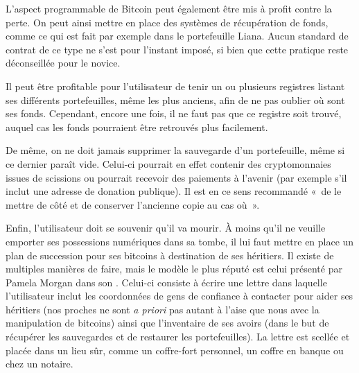 L'aspect programmable de Bitcoin peut également être mis à profit contre la perte. On peut ainsi mettre en place des systèmes de récupération de fonds, comme ce qui est fait par exemple dans le portefeuille Liana. Aucun standard de contrat de ce type ne s'est pour l'instant imposé, si bien que cette pratique reste déconseillée pour le novice. %

Il peut être profitable pour l'utilisateur de tenir un ou plusieurs registres listant ses différents portefeuilles, même les plus anciens, afin de ne pas oublier où sont ses fonds. Cependant, encore une fois, il ne faut pas que ce registre soit trouvé, auquel cas les fonds pourraient être retrouvés plus facilement.

De même, on ne doit jamais supprimer la sauvegarde d'un portefeuille, même si ce dernier paraît vide. Celui-ci pourrait en effet contenir des cryptomonnaies issues de scissions ou pourrait recevoir des paiements à l'avenir (par exemple s'il inclut une adresse de donation publique). Il est en ce sens recommandé «~de le mettre de côté et de conserver l'ancienne copie au cas où~».

Enfin, l'utilisateur doit se souvenir qu'il va mourir. À moins qu'il ne veuille emporter ses possessions numériques dans sa tombe, il lui faut mettre en place un plan de succession pour ses bitcoins à destination de ses héritiers. Il existe de multiples manières de faire, mais le modèle le plus réputé est celui présenté par Pamela Morgan dans son . Celui-ci consiste à écrire une lettre dans laquelle l'utilisateur inclut les coordonnées de gens de confiance à contacter pour aider ses héritiers (nos proches ne sont \emph{a priori} pas autant à l'aise que nous avec la manipulation de bitcoins) ainsi que l'inventaire de ses avoirs (dans le but de récupérer les sauvegardes et de restaurer les portefeuilles). La lettre est scellée et placée dans un lieu sûr, comme un coffre-fort personnel, un coffre en banque ou chez un notaire.

